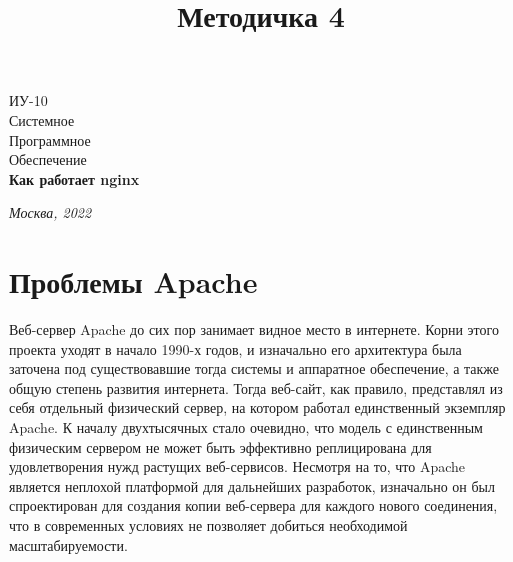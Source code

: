 \documentclass[14pt, a4paper]{article}
\title{Методичка 4}
\begin{document}
\begin{titlepage}
    \topmargin=216pt
    \newpage
    \hangindent=0.7cm
    \huge ИУ-10\\
    Системное\\
    Программное\\
    Обеспечение\\
    \textbf{Как работает nginx}

    \vspace{10cm}

    \begin{center}
        \small\textit{Москва, 2022}
    \end{center}
\end{titlepage}\newpage

\tableofcontents
\newpage

\begin{figure}[h]%
    \centering
    \label{1.0}
\end{figure}

\section*{Проблемы Apache}

Веб-сервер Apache до сих пор занимает видное место в интернете. Корни этого проекта уходят в начало 
1990-х годов, и изначально его архитектура была заточена под существовавшие тогда системы и аппаратное 
обеспечение, а также общую степень развития интернета. Тогда веб-сайт, как правило, представлял из себя 
отдельный физический сервер, на котором работал единственный экземпляр Apache. К началу двухтысячных 
стало очевидно, что модель с единственным физическим сервером не может быть эффективно реплицирована 
для удовлетворения нужд растущих веб-сервисов. Несмотря на то, что Apache является неплохой 
платформой для дальнейших разработок, изначально он был спроектирован для создания копии веб-сервера 
для каждого нового соединения, что в современных условиях не позволяет добиться необходимой масштабируемости.
\end{document}

